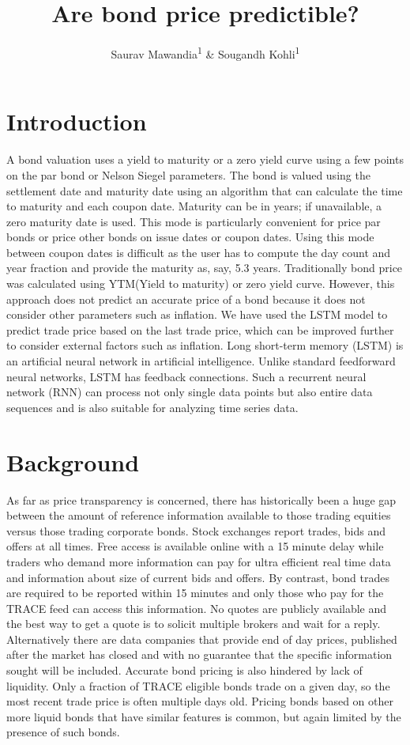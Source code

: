 \documentclass[
  man]{apa6}
\title{Are bond price predictible?}
\author{Saurav Mawandia\textsuperscript{1} \& Sougandh Kohli\textsuperscript{1}}
\date{}
\affiliation{\vspace{0.5cm}\textsuperscript{1} Harrisburg University of Science and Technology}
\begin{document}
\maketitle

\hypertarget{introduction}{%
\section{Introduction}\label{introduction}}

A bond valuation uses a yield to maturity or a zero yield curve using a few points on the par bond or Nelson Siegel parameters. The bond is valued using the settlement date and maturity date using an algorithm that can calculate the time to maturity and each coupon date. Maturity can be in years; if unavailable, a zero maturity date is used. This mode is particularly convenient for price par bonds or price other bonds on issue dates or coupon dates. Using this mode between coupon dates is difficult as the user has to compute the day count and year fraction and provide the maturity as, say, 5.3 years. Traditionally bond price was calculated using YTM(Yield to maturity) or zero yield curve. However, this approach does not predict an accurate price of a bond because it does not consider other parameters such as inflation. We have used the LSTM model to predict trade price based on the last trade price, which can be improved further to consider external factors such as inflation.
Long short-term memory (LSTM) is an artificial neural network in artificial intelligence. Unlike standard feedforward neural networks, LSTM has feedback connections. Such a recurrent neural network (RNN) can process not only single data points but also entire data sequences and is also suitable for analyzing time series data.

\hypertarget{background}{%
\section{Background}\label{background}}

As far as price transparency is concerned, there has historically been a huge gap between the amount of reference information available to those trading equities versus those trading corporate bonds. Stock exchanges report trades, bids and offers at all times. Free access is available online with a 15 minute delay while traders who demand more information can pay for ultra efficient real time data and information about size of current bids and offers. By contrast, bond trades are required to be reported within 15 minutes and only those who pay for the TRACE feed can access this information. No quotes are publicly available and the best way to get a quote is to solicit multiple brokers and wait for a reply. Alternatively there are data companies that provide end of day prices, published after the market has closed and with no guarantee that the specific information sought will be included. Accurate bond pricing is also hindered by lack of liquidity. Only a fraction of TRACE eligible bonds trade on a given day, so the most recent trade price is often multiple days old. Pricing bonds based on other more liquid bonds that have similar features is common, but again limited by the presence of such bonds.
\end{document}
